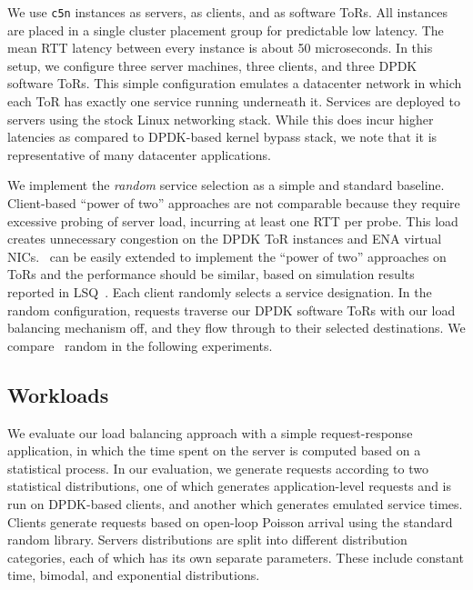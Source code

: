 We use \servers \texttt{c5n} instances as servers, \clients as clients, and
\tors as software ToRs. All instances are placed in a single cluster placement
group for predictable low latency. The mean RTT latency between every instance
is about 50 microseconds.  In this setup, we configure three server machines,
three clients, and three DPDK software ToRs. This simple configuration emulates
a datacenter network in which each ToR has exactly one service running
underneath it.  Services are deployed to servers using the stock Linux
networking stack.  While this does incur higher latencies as compared to
DPDK-based kernel bypass stack, we note that it is representative of many
datacenter applications.


We implement the \textit{random} service selection as a simple and standard
baseline. Client-based ``power of two'' approaches are not comparable because
they require excessive probing of server load, incurring at least one RTT per
probe. This load creates unnecessary congestion on the DPDK ToR instances and
ENA virtual NICs.  \toolname\ can be easily extended to implement the ``power
of two'' approaches on ToRs and the performance should be similar, based on
simulation results reported in LSQ~\cite{lsq}.  Each client randomly selects a
service designation. In the random configuration, requests traverse our DPDK
software ToRs with our load balancing mechanism off, and they flow through to
their selected destinations. We compare \toolname\ random in
the following experiments.

\subsection{Workloads}

We evaluate our load balancing approach with a simple request-response
application, in which the time spent on the server is computed based on a
statistical process.  In our evaluation, we generate requests according to two
statistical distributions, one of which generates application-level requests
and is run on DPDK-based clients, and another which generates emulated service
times. Clients generate requests based on open-loop Poisson arrival using the
standard random library.  Servers distributions are split into different
distribution categories, each of which has its own separate parameters. These
include constant time, bimodal, and exponential distributions. 

